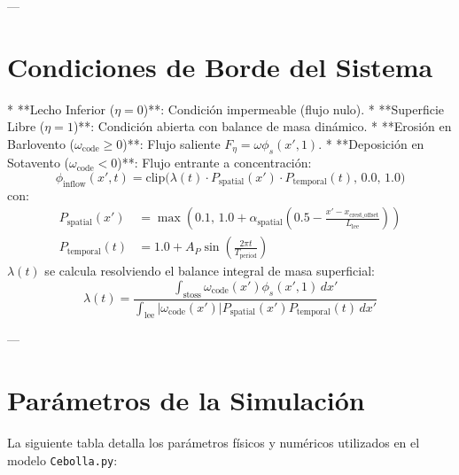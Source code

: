 \documentclass[11pt,a4paper]{article}
\begin{document}
---

\section{Condiciones de Borde del Sistema}
* **Lecho Inferior ($\eta = 0$)**: Condición impermeable (flujo nulo).
* **Superficie Libre ($\eta = 1$)**: Condición abierta con balance de masa dinámico.
  * **Erosión en Barlovento ($\omega_{\text{code}} \ge 0$)**: Flujo saliente $F_{\eta} = \omega \phi_s(x', 1)$.
  * **Deposición en Sotavento ($\omega_{\text{code}} < 0$)**: Flujo entrante a concentración:
    \begin{equation}
    \phi_{\text{inflow}}(x', t) = \text{clip}\Big(\lambda(t) \cdot P_{\text{spatial}}(x') \cdot P_{\text{temporal}}(t), \, 0.0, \, 1.0\Big)
    \end{equation}
    con:
    \begin{align}
    P_{\text{spatial}}(x') &= \max\left(0.1, \, 1.0 + \alpha_{\text{spatial}} \left(0.5 - \frac{x' - x_{\text{crest\_offset}}}{L_{\text{lee}}}\right)\right) \\
    P_{\text{temporal}}(t) &= 1.0 + A_P \sin\left(\frac{2\pi t}{T_{\text{period}}}\right)
    \end{align}
    $\lambda(t)$ se calcula resolviendo el balance integral de masa superficial:
    \begin{equation}
    \lambda(t) = \frac{\int_{\text{stoss}} \omega_{\text{code}}(x') \phi_s(x', 1) \, dx'}{\int_{\text{lee}} |\omega_{\text{code}}(x')| P_{\text{spatial}}(x') P_{\text{temporal}}(t) \, dx'}
    \end{equation}

---

\section{Parámetros de la Simulación}
La siguiente tabla detalla los parámetros físicos y numéricos utilizados en el modelo \texttt{Cebolla.py}:
\end{document}
